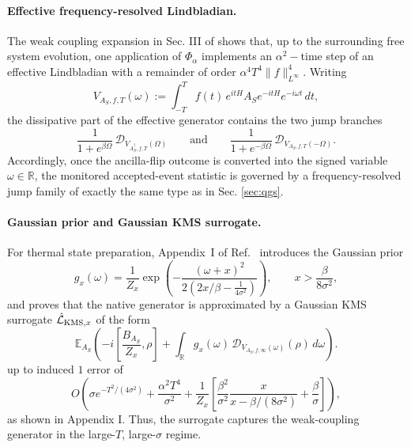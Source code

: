\documentclass[showpacs,amsmath,amssymb,twocolumn,prx,superscriptaddress,10pt,aps,nofootinbib]{revtex4-2}
\begin{document}
\paragraph{Effective frequency-resolved Lindbladian.}
The weak coupling expansion in Sec. III of \cite{Ding2025} shows that, up to the surrounding free system evolution, one application of $\Phi_\alpha$ implements an $\alpha^2-$time step of an effective Lindbladian with a remainder of order $\alpha^4T^4\|f\|^4_{L^\infty}$. Writing
\begin{equation}
V_{A_S,f,T}(\omega)
:=
\int_{-T}^{T}
f(t)\,e^{itH}A_S e^{-itH}e^{-i\omega t}\,dt,
\end{equation}
the dissipative part of the effective generator contains the two jump branches
\begin{equation*}
\frac{1}{1+e^{\beta\Omega}}\,
\mathcal D_{V_{A_S^\dagger,f,T}(\Omega)}
\qquad\text{and}\qquad
\frac{1}{1+e^{-\beta\Omega}}\,
\mathcal D_{V_{A_S,f,T}(-\Omega)}.
\end{equation*}
Accordingly, once the ancilla-flip outcome is converted into the signed variable $\omega\in\mathbb R$, the monitored accepted-event statistic is governed by a frequency-resolved jump family of exactly the same type as in Sec. \ref{sec:qgs}.

\paragraph{Gaussian prior and Gaussian KMS surrogate.}
For thermal state preparation, Appendix~I of Ref.~\cite{Ding2025} introduces the Gaussian prior
\begin{equation*}
g_x(\omega)
=
\frac{1}{Z_x}
\exp\!\left(
-\frac{(\omega+x)^2}{2\left(2x/\beta-\frac{1}{4\sigma^2}\right)}
\right),
\qquad
x>\frac{\beta}{8\sigma^2},
\end{equation*}
and proves that the native generator is approximated by a Gaussian KMS surrogate $\hat{\mathcal{L}}_{{\rm{KMS}},x}$ of the form
\begin{equation}
\mathbb E_{A_S}\!\left(
-i\left[\frac{B_{A_S}}{Z_x},\rho\right]
+
\int_{\mathbb R}
g_x(\omega)\,
\mathcal D_{V_{A_S,f,\infty}(\omega)}(\rho)\,d\omega
\right).
\end{equation}
up to induced $1$ error of
\begin{equation*}
O\!\left(
\sigma e^{-T^2/(4\sigma^2)}
+\frac{\alpha^2T^4}{\sigma^2}
+\frac{1}{Z_x}\left[
\frac{\beta^2}{\sigma^2}
\frac{x}{x-\beta/(8\sigma^2)}
+\frac{\beta}{\sigma}
\right]
\right),
\end{equation*}
as shown in Appendix I. Thus, the surrogate captures the weak-coupling generator in the large-$T$, large-$\sigma$ regime.
\end{document}

